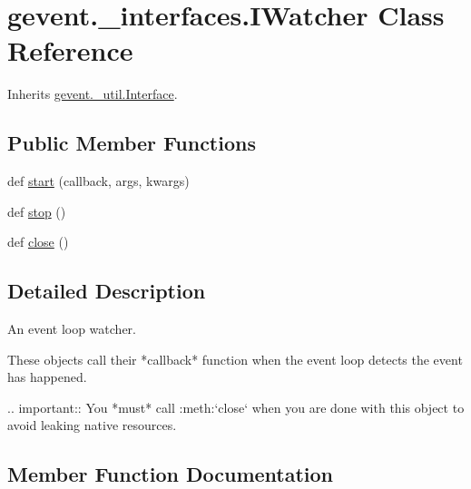 \hypertarget{classgevent_1_1__interfaces_1_1_i_watcher}{}\section{gevent.\+\_\+interfaces.\+I\+Watcher Class Reference}
\label{classgevent_1_1__interfaces_1_1_i_watcher}


Inherits \hyperlink{classgevent_1_1__util_1_1_interface}{gevent.\+\_\+util.\+Interface}.

\subsection*{Public Member Functions}
\begin{DoxyCompactItemize}
\item 
def \hyperlink{classgevent_1_1__interfaces_1_1_i_watcher_a0ecb4c9a628a14ba3cd45bdf0b2a7387}{start} (callback, args, kwargs)
\item 
def \hyperlink{classgevent_1_1__interfaces_1_1_i_watcher_a285925e2c547d325758920cf94f961b6}{stop} ()
\item 
def \hyperlink{classgevent_1_1__interfaces_1_1_i_watcher_a119615038fcb2da7473f22b8570b90bb}{close} ()
\end{DoxyCompactItemize}


\subsection{Detailed Description}
\begin{DoxyVerb}An event loop watcher.

These objects call their *callback* function when the event
loop detects the event has happened.

.. important:: You *must* call :meth:`close` when you are
   done with this object to avoid leaking native resources.
\end{DoxyVerb}
 

\subsection{Member Function Documentation}
\mbox{\label{classgevent_1_1__interfaces_1_1_i_watcher_a119615038fcb2da7473f22b8570b90bb}} 
